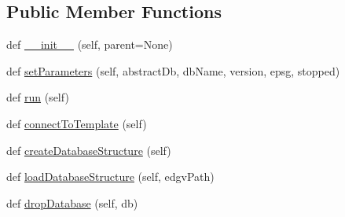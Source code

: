 \subsection*{Public Member Functions}
\begin{DoxyCompactItemize}
\item 
def \mbox{\hyperlink{class_dsg_tools_1_1_factories_1_1_thread_factory_1_1postgis_db_thread_1_1_postgis_db_thread_a4656c6b46ffcfa986fb43cc0641db3c2}{\+\_\+\+\_\+init\+\_\+\+\_\+}} (self, parent=None)
\item 
def \mbox{\hyperlink{class_dsg_tools_1_1_factories_1_1_thread_factory_1_1postgis_db_thread_1_1_postgis_db_thread_af2d59afbdd618d1a19687cc083fe75f2}{set\+Parameters}} (self, abstract\+Db, db\+Name, version, epsg, stopped)
\item 
def \mbox{\hyperlink{class_dsg_tools_1_1_factories_1_1_thread_factory_1_1postgis_db_thread_1_1_postgis_db_thread_a314b36ebbaa664e125320406c8121091}{run}} (self)
\item 
def \mbox{\hyperlink{class_dsg_tools_1_1_factories_1_1_thread_factory_1_1postgis_db_thread_1_1_postgis_db_thread_a0426a86f79d618800480ef30c5432c8b}{connect\+To\+Template}} (self)
\item 
def \mbox{\hyperlink{class_dsg_tools_1_1_factories_1_1_thread_factory_1_1postgis_db_thread_1_1_postgis_db_thread_a907e00bab6dfd9aacd2a4157330a6dbf}{create\+Database\+Structure}} (self)
\item 
def \mbox{\hyperlink{class_dsg_tools_1_1_factories_1_1_thread_factory_1_1postgis_db_thread_1_1_postgis_db_thread_af5c5bd0603c93b226b72ba5a2c467c96}{load\+Database\+Structure}} (self, edgv\+Path)
\item 
def \mbox{\hyperlink{class_dsg_tools_1_1_factories_1_1_thread_factory_1_1postgis_db_thread_1_1_postgis_db_thread_a94eafae562bc5ec0dfe616e42575a167}{drop\+Database}} (self, db)
\end{DoxyCompactItemize}
